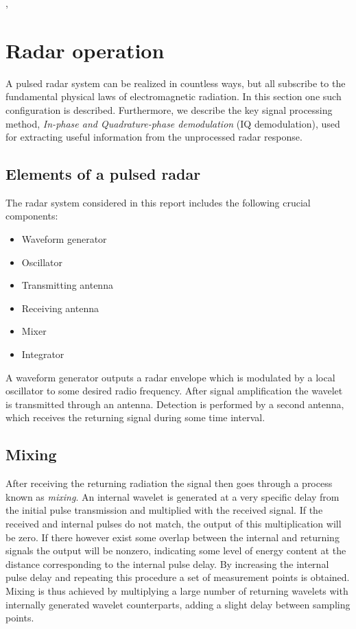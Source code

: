 \citep{skolnik_2009}, \citep{richards_2014}


\section{Radar operation}

A pulsed radar system can be realized in countless ways, but all subscribe to the fundamental physical laws of electromagnetic radiation. In this section one such configuration is described. Furthermore, we describe the key signal processing method, \emph{In-phase and Quadrature-phase demodulation} (IQ demodulation), used for extracting useful information from the unprocessed radar response. 

\subsection{Elements of a pulsed radar}
The radar system considered in this report includes the following crucial components:

\begin{itemize}
	\item Waveform generator
	\item Oscillator
	\item Transmitting antenna
	\item Receiving antenna
	\item Mixer
	\item Integrator
\end{itemize}



A waveform generator outputs a radar envelope which is modulated by a local oscillator to some desired radio frequency. After signal amplification the wavelet is transmitted through an antenna. Detection is performed by a second antenna, which receives the returning signal during some time interval. 

\subsection{Mixing}

After receiving the returning radiation the signal then goes through a process known as \emph{mixing}. An internal wavelet is generated at a very specific delay from the initial pulse transmission and multiplied with the received signal. If the received and internal pulses do not match, the output of this multiplication will be zero. If there however exist some overlap between the internal and returning signals the output will be nonzero, indicating some level of energy content at the distance corresponding to the internal pulse delay. By increasing the internal pulse delay and repeating this procedure a set of measurement points is obtained. Mixing is thus achieved by multiplying a large number of returning wavelets with internally generated wavelet counterparts, adding a slight delay between sampling points. 

